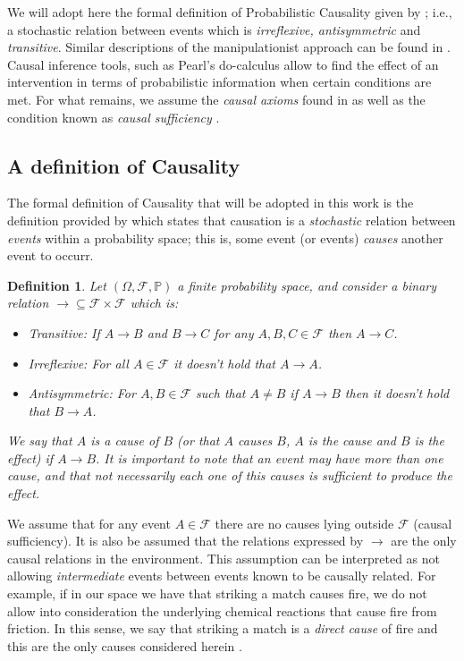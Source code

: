 \documentclass[review]{elsarticle}
\newtheorem{definition}[theorem]{Definition}
\begin{document}
We will adopt here the formal definition of Probabilistic Causality given by \cite{spirtes2000causation}; i.e., a stochastic relation between events which is \textit{irreflexive, antisymmetric} and \textit{transitive}. Similar descriptions of the manipulationist approach can be found in \cite{holland1986statistics}. Causal inference tools, such as Pearl's do-calculus \citep{pearl2009causality} allow to find the effect of an intervention in terms of probabilistic information when certain conditions are met. For what remains, we assume the \textit{causal axioms} found in \citep{spirtes2000causation} as well as the condition known as \textit{causal sufficiency} \citep{pearl2009causality}.

\subsection{A definition of Causality}
The formal definition of Causality that will be adopted in this work is the definition provided by \cite{spirtes2000causation} which states that causation is a \textit{stochastic} relation between \textit{events} within a probability space; this is, some event (or events) \textit{causes} another event to occurr.
\begin{definition}{\label{causal_relation}}
Let $(\Omega, \mathcal{F}, \mathbb{P})$ a finite probability space, and consider a binary relation $\to \subseteq \mathcal{F} \times \mathcal{F}$ which is:
\begin{itemize}
\item Transitive: If $A \to B$ and $B \to C$ for any $A, B, C \in \mathcal{F}$ then $A \to C$.
\item Irreflexive: For all $A \in \mathcal{F}$ it doesn't hold that $A \to A$.
\item Antisymmetric: For $A,B \in \mathcal{F}$ such that $A \neq B$ if $A \to B$ then it doesn't hold that $B \to A$.
\end{itemize}
We say that $A$ is \textit{a cause} of $B$ (or that $A$ causes $B$, $A$ is the cause and $B$ is the effect) if $A \to B$. It is important to note that an event may have more than one cause, and that not necessarily each one of this causes is sufficient to produce the effect. 
\end{definition}

We assume that for any event $A \in \mathcal{F}$ there are no causes lying outside $\mathcal{F}$ (causal sufficiency). It is also be assumed that the relations expressed by $\to$ are the only causal relations in the environment. This assumption can be interpreted as not allowing \textit{intermediate} events between events known to be causally related. For example, if in our space we have that striking a match causes fire, we do not allow into consideration the underlying chemical reactions that cause fire from friction. In this sense, we say that striking a match is a \textit{direct cause} of fire and this are the only causes considered herein \citep{spirtes2000causation}. 
\end{document}
